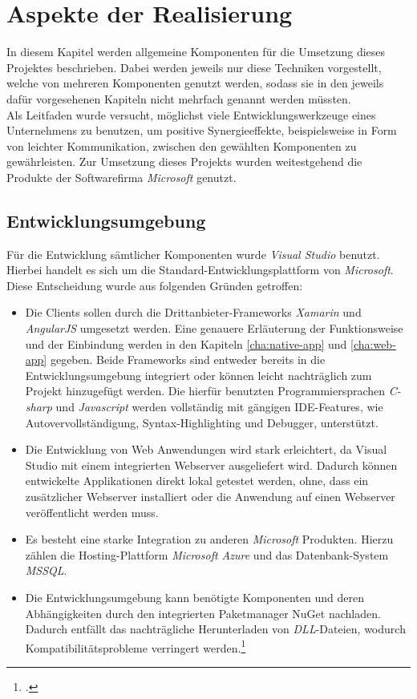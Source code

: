 \chapter{Aspekte der Realisierung}
\label{cha:realisierung}
In diesem Kapitel werden allgemeine Komponenten für die Umsetzung dieses Projektes beschrieben. Dabei werden jeweils nur diese Techniken vorgestellt, welche von mehreren Komponenten genutzt werden, sodass sie in den jeweils dafür vorgesehenen Kapiteln nicht mehrfach genannt werden müssten. \\
Als Leitfaden wurde versucht, möglichst viele Entwicklungswerkzeuge eines Unternehmens zu benutzen, um positive Synergieeffekte, beispielsweise in Form von leichter Kommunikation, zwischen den gewählten Komponenten zu gewährleisten. Zur Umsetzung dieses Projekts wurden weitestgehend die Produkte der Softwarefirma \textit{Microsoft} genutzt.

\section{Entwicklungsumgebung}
\label{sec:entwicklungsumgebung}
Für die Entwicklung sämtlicher Komponenten wurde \textit{\ac{Visual Studio}} benutzt. Hierbei handelt es sich um die Standard-Entwicklungsplattform von \textit{Microsoft}. Diese Entscheidung wurde aus folgenden Gründen getroffen:
\begin{itemize}
\item Die Clients sollen durch die Drittanbieter-Frameworks \textit{Xamarin} und \textit{AngularJS} umgesetzt werden. Eine genauere Erläuterung der Funktionsweise und der Einbindung werden in den Kapiteln \ref{cha:native-app} und \ref{cha:web-app} gegeben. Beide Frameworks sind entweder bereits in die Entwicklungsumgebung integriert oder können leicht nachträglich zum Projekt hinzugefügt werden. Die hierfür benutzten Programmiersprachen \textit{\gls{C-sharp}} und \textit{\gls{Javascript}} werden vollständig mit gängigen \ac{IDE}-Features, wie Autovervollständigung, Syntax-Highlighting und Debugger, unterstützt. 
\item Die Entwicklung von Web Anwendungen wird stark erleichtert, da \ac{Visual Studio} mit einem integrierten Webserver ausgeliefert wird. Dadurch können entwickelte Applikationen direkt lokal getestet werden, ohne, dass ein zusätzlicher Webserver installiert oder die Anwendung auf einen Webserver veröffentlicht werden muss.
\item Es besteht eine starke Integration zu anderen \textit{Microsoft} Produkten. Hierzu zählen die Hosting-Plattform \textit{Microsoft Azure} und das Datenbank-System \textit{\ac{MSSQL}}.
\item Die Entwicklungsumgebung kann benötigte Komponenten und deren Abhängigkeiten durch den integrierten Paketmanager \gls{NuGet} nachladen. Dadurch entfällt das nachträgliche Herunterladen von \textit{\ac{DLL}}-Dateien, wodurch Kompatibilitätsprobleme verringert werden.\footcite{online:VisualStudio}
\end{itemize}
